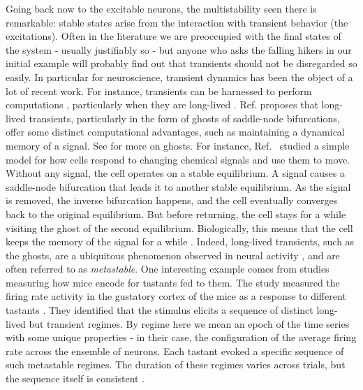 Going back now to the excitable neurons, the multistability seen there is remarkable: stable states arise from the interaction with transient behavior (the excitations). Often in the literature we are preoccupied with the final states of the system - usually justifiably so - but anyone who asks the falling hikers in our initial example will probably find out that transients should not be disregarded so easily. In particular for neuroscience, transient dynamics has been the object of a lot of recent work. For instance, transients can be harnessed to perform computations \cite{budzinski2024exact}, particularly when they are long-lived \cite{koch2024biological}. Ref. \cite{koch2024biological} proposes that long-lived transients, particularly in the form of ghosts of saddle-node bifurcations, offer some distinct computational advantages, such as maintaining a dynamical memory of a signal. See  for more on ghosts. For instance, Ref.~\cite{nandan2022cells} studied a simple model for how cells respond to changing chemical signals and use them to move. Without any signal, the cell operates on a stable equilibrium. A signal causes a saddle-node bifurcation that leads it to another stable equilibrium. As the signal is removed, the inverse bifurcation happens, and the cell eventually converges back to the original equilibrium. But before returning, the cell stays for a while visiting the ghost of the second equilibrium. Biologically, this means that the cell keeps the memory of the signal for a while \cite{nandan2022cells, koch2024biological}. 
Indeed, long-lived transients, such as the ghosts, are a ubiquitous phenomenon observed in neural activity \cite{tognoli2014metastable, brinkman2022metastable}, and are often referred to as \textit{metastable}. One interesting example comes from studies measuring how mice encode for tastants fed to them. The study measured the firing rate activity in the gustatory cortex of the mice as a response to different tastants \cite{jones2007natural}. They identified that the stimulus elicits a sequence of distinct long-lived but transient regimes. By regime here we mean an epoch of the time series with some unique properties - in their case, the configuration of the average firing rate across the ensemble of neurons. Each tastant evoked a specific sequence of such metastable regimes. The duration of these regimes varies across trials, but the sequence itself is consistent \cite{lacamera2019cortical, brinkman2022metastable}.

